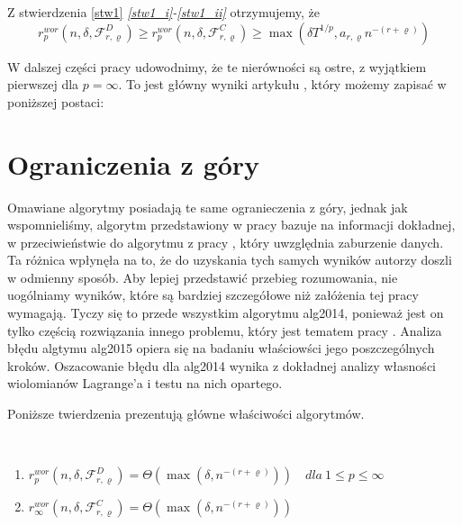 \documentclass[oik, pdftex, robocza, man]{mgrwms}
\begin{document}
    Z stwierdzenia \ref{stw1} \textit{\ref{stw1_i}-\ref{stw1_ii}} otrzymujemy, że 
    \begin{equation*}
        r^{wor}_{p}(n, \delta, \mathcal{F}^{D}_{r,\varrho}) \geq r^{wor}_{p}(n, \delta, \mathcal{F}^{C}_{r,\varrho}) \geq \max(\delta T^{1/p}, a_{r,\varrho} n^{-(r+\varrho)})
    \end{equation*}

    W dalszej części pracy udowodnimy, że te nierówności są ostre, z wyjątkiem pierwszej dla $p=\infty$. To jest główny wyniki artykułu \cite{AoP}, który możemy zapisać w poniższej postaci:

    \section{Ograniczenia z góry}

    Omawiane algorytmy posiadają te same ogranieczenia z góry, jednak jak wspomnieliśmy, algorytm przedstawiony w pracy \cite{CoDF} bazuje na informacji dokładnej, w przeciwieństwie do algorytmu z pracy \cite{AoP}, który uwzględnia zaburzenie danych. Ta różnica wpłynęła na to, że do uzyskania tych samych wyników autorzy doszli w odmienny sposób. Aby lepiej przedstawić przebieg rozumowania, nie uogólniamy wyników, które są bardziej szczegółowe niż załóżenia tej pracy wymagają. Tyczy się to przede wszystkim algorytmu alg2014, ponieważ jest on tylko częścią rozwiązania innego problemu, który jest tematem pracy \cite{CoDF}. Analiza błędu algtymu alg2015 opiera się na badaniu właściowści jego poszczególnych kroków. Oszacowanie błędu dla alg2014 wynika z dokładnej analizy własności wiolomianów Lagrange'a i testu na nich opartego.

    Poniższe twierdzenia prezentują główne właściwości algorytmów.
    
    \begin{thm} \label{AoP_tw1} ~%
        \begin{enumerate}
            \item $r^{wor}_{p}(n, \delta, \mathcal{F}^{D}_{r,\varrho}) = \Theta(\max(\delta, n^{-(r+\varrho)})) \quad dla \: 1 \leq p \leq \infty$
            \item $r^{wor}_{\infty}(n, \delta, \mathcal{F}^{C}_{r,\varrho}) = \Theta(\max(\delta, n^{-(r+\varrho)}))$
        \end{enumerate}
    \end{thm}
\end{document}
